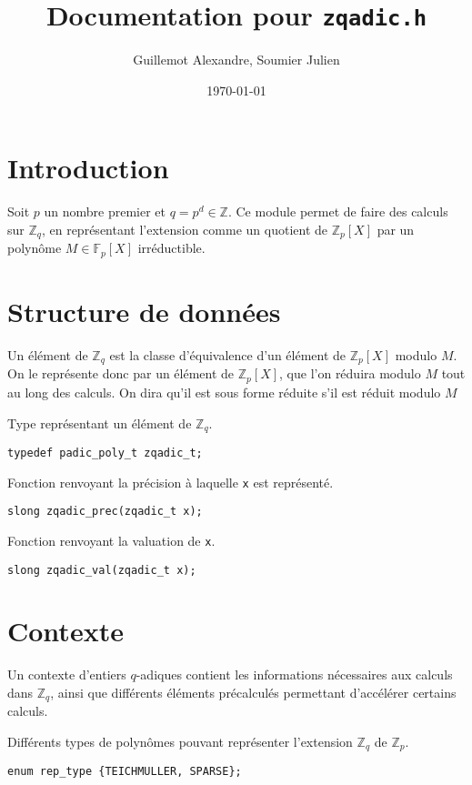 \documentclass[11pt]{article}
\begin{document}
\title{Documentation pour \texttt{zqadic.h}}
\date{\today}
\author{Guillemot Alexandre, Soumier Julien}
\maketitle

\tableofcontents

\section{Introduction}
Soit $p$ un nombre premier et $q = p^d \in \mathbb{Z}$. Ce module permet de faire des calculs sur $\mathbb{Z}_{q}$, en représentant l'extension comme un quotient de $\mathbb{Z}_p[X]$ par un polynôme $M \in \mathbb{F}_p[X]$ irréductible.


\section{Structure de données}
Un élément de $\mathbb{Z}_q$ est la classe d'équivalence d'un élément de $\mathbb{Z}_p[X]$ modulo $M$. On le représente donc par un élément de $\mathbb{Z}_p[X]$, que l'on réduira modulo $M$ tout au long des calculs. On dira qu'il est sous forme réduite s'il est réduit modulo $M$

Type représentant un élément de $\mathbb{Z}_q$.
\begin{verbatim}
typedef padic_poly_t zqadic_t;
\end{verbatim}

Fonction renvoyant la précision à laquelle \texttt{x} est représenté.
\begin{verbatim}
slong zqadic_prec(zqadic_t x);
\end{verbatim}

Fonction renvoyant la valuation de \texttt{x}.
\begin{verbatim}
slong zqadic_val(zqadic_t x);
\end{verbatim}


\section{Contexte}
Un contexte d'entiers $q$-adiques contient les informations nécessaires aux calculs dans $\mathbb{Z}_q$, ainsi que différents éléments précalculés permettant d'accélérer certains calculs.

Différents types de polynômes pouvant représenter l'extension $\mathbb{Z}_q$ de $\mathbb{Z}_p$.
\begin{verbatim}
enum rep_type {TEICHMULLER, SPARSE};
\end{verbatim}
\end{document}
